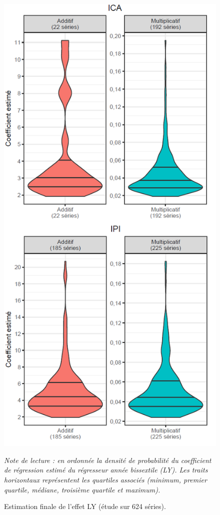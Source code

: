 \documentclass[12pt, a4paper, french]{article}
\begin{document}
\begin{figure}[!ht]
\begin{center}
 \includegraphics[scale=0.65]{img/LYvaleur2.png}
 \caption[Estimation finale de l'effet LY (étude sur 624 séries)]{Estimation finale de l'effet LY (étude sur 624 séries).}
 \label{fig:LYvaleur}
\end{center}
\vspace{-0.3cm}
\footnotesize\emph{Note de lecture : en ordonnée la densité de probabilité du coefficient de régression estimé du régresseur année bissextile (LY). Les traits horizontaux représentent les quartiles associés (minimum, premier quartile, médiane, troisième quartile et maximum).}
\end{figure}
\end{document}

